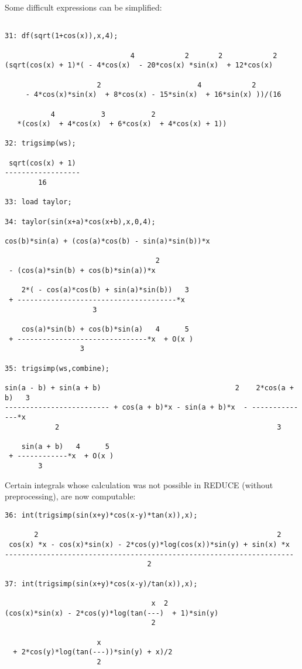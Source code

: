 Some difficult expressions can be simplified:
{\small
\begin{verbatim}

31: df(sqrt(1+cos(x)),x,4);

                              4            2       2            2
(sqrt(cos(x) + 1)*( - 4*cos(x)  - 20*cos(x) *sin(x)  + 12*cos(x)

                      2                       4            2
     - 4*cos(x)*sin(x)  + 8*cos(x) - 15*sin(x)  + 16*sin(x) ))/(16

           4           3           2
   *(cos(x)  + 4*cos(x)  + 6*cos(x)  + 4*cos(x) + 1))

32: trigsimp(ws);

 sqrt(cos(x) + 1)
------------------
        16

33: load taylor; 

34: taylor(sin(x+a)*cos(x+b),x,0,4);

cos(b)*sin(a) + (cos(a)*cos(b) - sin(a)*sin(b))*x

                                    2
 - (cos(a)*sin(b) + cos(b)*sin(a))*x

    2*( - cos(a)*cos(b) + sin(a)*sin(b))   3
 + --------------------------------------*x
                     3

    cos(a)*sin(b) + cos(b)*sin(a)   4      5
 + -------------------------------*x  + O(x )
                  3

35: trigsimp(ws,combine);

sin(a - b) + sin(a + b)                                2    2*cos(a + b)   3
------------------------- + cos(a + b)*x - sin(a + b)*x  - --------------*x
            2                                                    3

    sin(a + b)   4      5
 + ------------*x  + O(x )
        3
\end{verbatim}
}\noindent
Certain integrals whose calculation was not possible in REDUCE 
(without preprocessing), are now computable:
{\small
\begin{verbatim}
36: int(trigsimp(sin(x+y)*cos(x-y)*tan(x)),x);

       2                                                         2
 cos(x) *x - cos(x)*sin(x) - 2*cos(y)*log(cos(x))*sin(y) + sin(x) *x
---------------------------------------------------------------------
                                  2

37: int(trigsimp(sin(x+y)*cos(x-y)/tan(x)),x);

                                   x  2
(cos(x)*sin(x) - 2*cos(y)*log(tan(---)  + 1)*sin(y)
                                   2

                      x
  + 2*cos(y)*log(tan(---))*sin(y) + x)/2
                      2
\end{verbatim}
}\noindent

